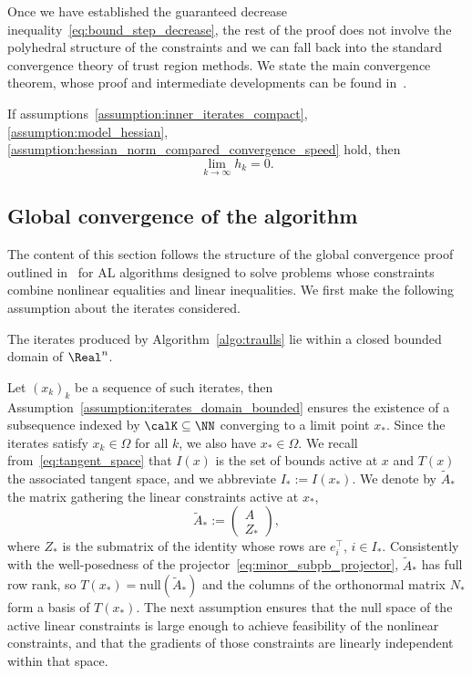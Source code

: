 Once we have established the guaranteed decrease inequality~\eqref{eq:bound_step_decrease}, the rest of the proof does not involve the polyhedral structure of the constraints and we can fall back into the standard convergence theory of trust region methods. We state the main convergence theorem, whose proof and intermediate developments can be found in~\cite{conn-etal:1988a}.
\begin{theorem}
	If assumptions~\ref{assumption:inner_iterates_compact}, \ref{assumption:model_hessian}, \ref{assumption:hessian_norm_compared_convergence_speed} hold, then
	\[\lim\limits_{k\to \infty} h_k = 0.\]
\end{theorem}

\subsection{Global convergence of the algorithm}

The content of this section follows the structure of the global convergence proof outlined in~\cite{conn-etal:1996b} for AL algorithms designed to solve problems whose constraints combine nonlinear equalities and linear inequalities. We first make the following assumption about the iterates considered.

\begin{assumption}\label{assumption:iterates_domain_bounded}
	The iterates produced by Algorithm~\ref{algo:traulls} lie within a closed bounded domain of $\Real^n$.
\end{assumption}

Let $(x_k)_k$ be a sequence of such iterates, then Assumption~\ref{assumption:iterates_domain_bounded} ensures the existence of a subsequence indexed by $\calK \subseteq \NN$ converging to a limit point $x_*$. Since the iterates satisfy $x_k \in \Omega$ for all $k$, we also have $x_* \in \Omega$. We recall from~\eqref{eq:tangent_space} that $I(x)$ is the set of bounds active at $x$ and $T(x)$ the associated tangent space, and we abbreviate $I_* := I(x_*)$. We denote by $\tilde A_*$ the matrix gathering the linear constraints active at $x_*$,
\begin{equation*}
	\tilde A_* := \begin{pmatrix} A \\ Z_* \end{pmatrix},
\end{equation*}
where $Z_*$ is the submatrix of the identity whose rows are $e_i^\top$, $i \in I_*$. Consistently with the well-posedness of the projector~\eqref{eq:minor_subpb_projector}, $\tilde A_*$ has full row rank, so $T(x_*) = \mathrm{null}(\tilde A_*)$ and the columns of the orthonormal matrix $N_*$ form a basis of $T(x_*)$. The next assumption ensures that the null space of the active linear constraints is large enough to achieve feasibility of the nonlinear constraints, and that the gradients of those constraints are linearly independent within that space.

